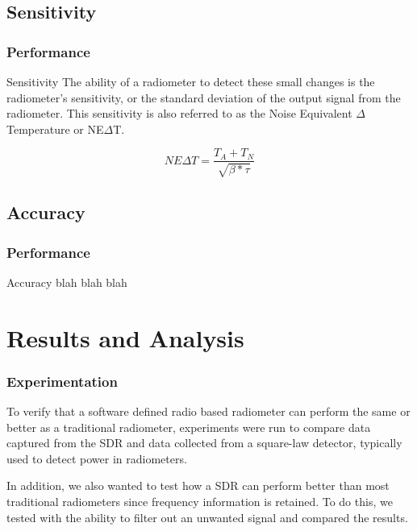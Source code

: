 \documentclass[notes]{beamer}
\begin{document}
\subsection{Sensitivity}
\begin{frame}
\frametitle{Performance}
\begin{block}{Sensitivity}
The ability of a radiometer to detect these small changes is the radiometer's sensitivity, or the standard deviation of the output signal from the radiometer.  This sensitivity is also referred to as the Noise Equivalent $\Delta$ Temperature or NE$\Delta$T. 

\begin{equation}\label{NEAT}
NE\Delta T=\frac{T_{A}+T_{N}}{\sqrt{\beta * \tau}}
\end{equation}
\end{block}
\end{frame}
\subsection{Accuracy}
\begin{frame}
\frametitle{Performance}
\begin{block}{Accuracy}
blah blah blah
\end{block}
\end{frame}


\section{Results and Analysis}
\begin{frame}
\frametitle{Experimentation}
To verify that a software defined radio based radiometer can perform the same or better as a traditional radiometer, experiments were run to compare data captured from the SDR and data collected from a square-law detector, typically used to detect power in radiometers.  

In addition, we also wanted to test how a SDR can perform better than most traditional radiometers since frequency information is retained.  To do this, we tested with the ability to filter out an unwanted signal and compared the results.
\end{frame}
\end{document}
